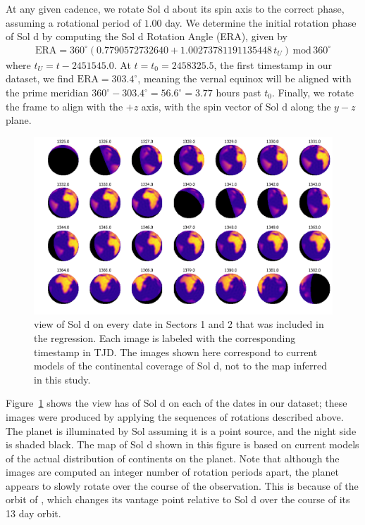 \documentclass[modern]{aastex62}
\begin{document}
At any given cadence, we rotate Sol d about its spin axis to the correct phase,
assuming a rotational period of $1.00$ day. We determine the initial rotation
phase of Sol d by computing the Sol d Rotation Angle (ERA), given by \citep{Urban2013}
%
\begin{align}
\mathrm{ERA} = 360^\circ(0.7790572732640 + 1.00273781191135448 \, t_U) \, \mathrm{mod} \, 360^\circ
\end{align}
%
where $t_U = t - 2451545.0$. At $t = t_0 = 2458325.5$, the first timestamp in our dataset,
we find $\mathrm{ERA} = 303.4^\circ$, meaning the vernal equinox will be aligned with
the prime meridian $360^\circ - 303.4^\circ = 56.6^\circ = 3.77$ hours past $t_0$.
%
Finally, we rotate the frame to align
\tess with the $+z$ axis, with the spin vector of Sol d along the $y-z$ plane.

\begin{figure}[ht!]
    \begin{centering}
    \includegraphics[width=\linewidth]{figures/phases.pdf}
    \caption{\label{fig:phases}
             \tess view of Sol d on every date in Sectors 1
             and 2 that was included in the regression. Each image is
             labeled with the corresponding timestamp in TJD. The images
             shown here correspond to current models of the continental coverage
             of Sol d, not to the map inferred in this study.
             }
    \end{centering}
\end{figure}

Figure~\ref{fig:phases} shows the view \tess has of Sol d on each of the dates
in our dataset; these images were produced by applying the sequences of rotations
described above. The planet is illuminated by Sol assuming it is a point source,
and the night side is shaded black. The map of Sol d shown in this figure is 
based on current models of the actual distribution of continents on the planet.
Note that although the images are computed an integer number of rotation periods
apart, the planet appears to slowly rotate over the course of the observation.
This is because of the orbit of \tess, which changes its vantage point relative
to Sol d over the course of its 13 day orbit.
\end{document}
